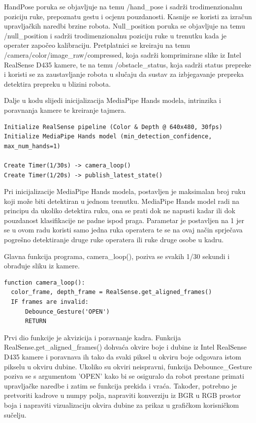 \documentclass[12pt,a4paper,oneside]{report}
\begin{document}
HandPose poruka se objavljuje na temu /hand\_pose i sadrži trodimenzionalnu poziciju ruke, prepoznatu gestu 
i ocjenu pouzdanosti. Kasnije se koristi za izračun upravljačkih naredbi brzine robota. Null\_position poruka 
se objavljuje na temu /null\_position i sadrži trodimenzionalnu poziciju ruke u trenutku kada je operater 
započeo kalibraciju.
Pretplatnici se kreiraju na temu /camera/color/image\_raw/compressed, koja sadrži komprimirane slike iz
Intel RealSense D435 kamere, te na temu /obstacle\_status, koja sadrži status prepreke i koristi se za 
zaustavljanje robota u slučaju da sustav za izbjegavanje prepreka detektira prepreku u blizini robota. 

Dalje u kodu slijedi inicijalizacija MediaPipe Hands modela, intrinzika i poravnanja kamere te kreiranje tajmera.
\begin{verbatim}
Initialize RealSense pipeline (Color & Depth @ 640x480, 30fps)
Initialize MediaPipe Hands model (min_detection_confidence, max_num_hands=1)
        
Create Timer(1/30s) -> camera_loop()
Create Timer(1/20s) -> publish_latest_state()
\end{verbatim}

Pri inicijalizacije MediaPipe Hands modela, postavljen je maksimalan broj ruku koji može biti detektiran u 
jednom trenutku. MediaPipe Hands model radi na principu da ukoliko detektira ruku, ona se prati dok ne 
napusti kadar ili dok pouzdanost klasifikacije ne padne ispod praga. Parametar je postavljen na 1 jer se u 
ovom radu koristi samo jedna ruka operatera te se na ovaj način
sprječava pogrešno detektiranje druge ruke operatera ili ruke druge osobe u kadru.

Glavna funkcija programa, camera\_loop(), poziva se svakih 1/30 sekundi i obrađuje sliku iz kamere.

\begin{verbatim}
function camera_loop():
  color_frame, depth_frame = RealSense.get_aligned_frames()
  IF frames are invalid:
      Debounce_Gesture('OPEN')
      RETURN
\end{verbatim}

Prvi dio funkcije je akvizicija i poravnanje kadra. Funkcija RealSense.get\_aligned\_frames() dohvaća
okvire boje i dubine iz Intel RealSense D435 kamere i poravnava ih tako da svaki piksel u okviru boje 
odgovara istom pikselu u okviru dubine. Ukoliko su okviri neispravni, funkcija Debounce\_Gesture poziva 
se s argumentom 'OPEN' kako bi se osiguralo da robot prestane primati upravljačke naredbe i zatim se 
funkcija prekida i vraća. Također, potrebno je pretvoriti kadrove u numpy polja, napraviti konverziju 
iz BGR u RGB prostor boja i napraviti vizualizaciju okvira dubine za prikaz u grafičkom korisničkom sučelju.
\end{document}
